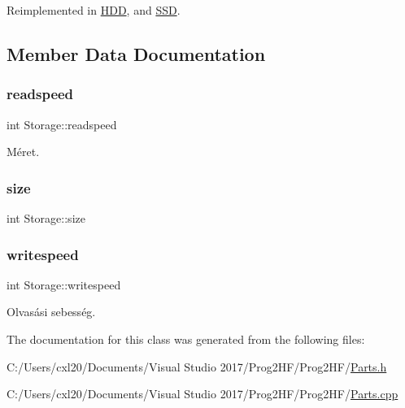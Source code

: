 Reimplemented in \mbox{\hyperlink{class_h_d_d_aca2c2583fa3304917905cd9185b64539}{H\+DD}}, and \mbox{\hyperlink{class_s_s_d_ab07086e302f8be99cfa757583d2017a0}{S\+SD}}.



\subsection{Member Data Documentation}
\mbox{\label{class_storage_a41073842ff16961dad3903e6dd49bb0c}} 
\subsubsection{\texorpdfstring{readspeed}{readspeed}}
{\footnotesize\ttfamily int Storage\+::readspeed\hspace{0.3cm}{\ttfamily [protected]}}



Méret. 

\mbox{\label{class_storage_abcc80ce58a21fa884035617ee0b6cb67}} 
\subsubsection{\texorpdfstring{size}{size}}
{\footnotesize\ttfamily int Storage\+::size\hspace{0.3cm}{\ttfamily [protected]}}

\mbox{\label{class_storage_a0198a1483ccf849d48c76da88599ba8b}} 
\subsubsection{\texorpdfstring{writespeed}{writespeed}}
{\footnotesize\ttfamily int Storage\+::writespeed\hspace{0.3cm}{\ttfamily [protected]}}



Olvasási sebesség. 



The documentation for this class was generated from the following files\+:\begin{DoxyCompactItemize}
\item 
C\+:/\+Users/cxl20/\+Documents/\+Visual Studio 2017/\+Prog2\+H\+F/\+Prog2\+H\+F/\mbox{\hyperlink{_parts_8h}{Parts.\+h}}\item 
C\+:/\+Users/cxl20/\+Documents/\+Visual Studio 2017/\+Prog2\+H\+F/\+Prog2\+H\+F/\mbox{\hyperlink{_parts_8cpp}{Parts.\+cpp}}\end{DoxyCompactItemize}
